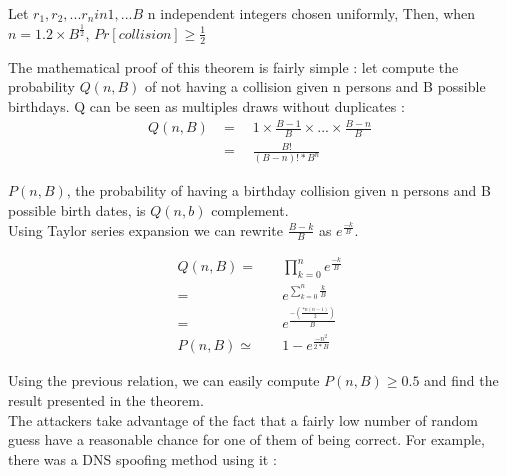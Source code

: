 \begin{mytheorem}
Let $r_1,r_2,...r_n in {1,...B}$ n independent integers chosen uniformly, \flushright Then, when $n = 1.2\times B^{\frac{1}{2}}$, $Pr[collision] \geq \frac{1}{2} $

\end{mytheorem}

The mathematical proof of this theorem is fairly simple : let compute the probability $Q(n,B)$ of not having a collision given n persons and B possible birthdays. Q can be seen as multiples draws without duplicates : \\

\begin{align}
    Q(n,B)& = \quad 1 \times \frac{B-1}{B} \times ... \times \frac{B-n}{B} \\
          & =\quad \frac{B!}{(B-n)!*B^n} 
\end{align}  



$P(n,B)$, the probability of having a birthday collision given n persons and B possible birth dates, is $Q(n,b)$ complement. \\
Using Taylor series expansion we can rewrite $\frac{B-k}{B}$ as $e^{\frac{-k}{B}}$.  

\begin{align}
    Q(n,B) =& \quad \prod_{k = 0}^n e^{\frac{-k}{B}}\\
           =& \quad e^{\sum_{k = 0}^n \frac{k}{B}}        \\
           =& \quad e^{ \frac{-(\frac{*n(n-1)}{2})}{B} }\\
    P(n,B) \simeq& \quad 1 - e^{ \frac{-n^2}{2*B} }       
\end{align}  


Using the previous relation, we can easily compute $P(n,B) \geq 0.5$ and find the result presented in the theorem.\\

The attackers take advantage of the fact that a fairly low number of random guess have a reasonable chance for one of them of being correct. For example, there was a DNS spoofing method using it : \\

